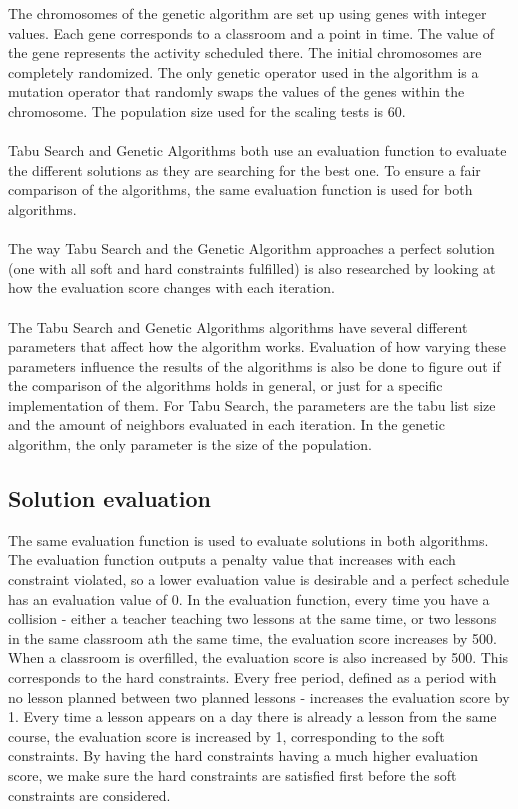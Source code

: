 \documentclass[titlepage,a4paper]{article}
\begin{document}
The chromosomes of the genetic algorithm are set up using genes with integer values. Each gene corresponds to a classroom and a point in time. The value of the gene represents the activity scheduled there. The initial chromosomes are completely randomized. The only genetic operator used in the algorithm is a mutation operator that randomly swaps the values of the genes within the chromosome. The population size used for the scaling tests is 60. \\\\
Tabu Search and Genetic Algorithms both use an evaluation function to evaluate the different solutions as they are searching for the best one. To ensure a fair comparison of the algorithms, the same evaluation function is used for both algorithms. \\\\
The way Tabu Search and the Genetic Algorithm approaches a perfect solution (one with all soft and hard constraints fulfilled) is also researched by looking at how the evaluation score changes with each iteration. \\\\
The Tabu Search and Genetic Algorithms algorithms have several different parameters that affect how the algorithm works. Evaluation of how varying these parameters influence the results of the algorithms is also be done to figure out if the comparison of the algorithms holds in general, or just for a specific implementation of them.
For Tabu Search, the parameters are the tabu list size and the amount of neighbors evaluated in each iteration. 
In the genetic algorithm, the only parameter is the size of the population.

\subsection{Solution evaluation}
The same evaluation function is used to evaluate solutions in both algorithms. The evaluation function outputs a penalty value that increases with each constraint violated, so a lower evaluation value is desirable and a perfect schedule has an evaluation value of 0. In the evaluation function, every time you have a collision - either a teacher teaching two lessons at the same time, or two lessons in the same classroom ath the same time, the evaluation score increases by 500. When a classroom is overfilled, the evaluation score is also increased by 500. This corresponds to the hard constraints. Every free period, defined as a period with no lesson planned between two planned lessons - increases the evaluation score by 1. Every time a lesson appears on a day there is already a lesson from the same course, the evaluation score is increased by 1, corresponding to the soft constraints. By having the hard constraints having a much higher evaluation score, we make sure the hard constraints are satisfied first before the soft constraints are considered.
\end{document}
